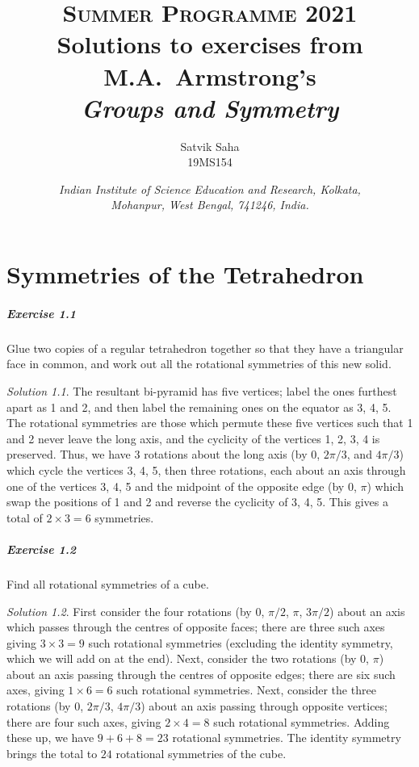 \documentclass[11pt]{report}
\title{
    \Large\textsc{Summer Programme 2021} \\
    \vspace{10pt}
    \huge Solutions to exercises from M.A.~Armstrong's \\
    \textit{Groups and Symmetry} 
}
\author{
    \large Satvik Saha%
    \\\textsc{\small 19MS154}
}
\date{\normalsize
    \textit{Indian Institute of Science Education and Research, Kolkata, \\
    Mohanpur, West Bengal, 741246, India.} \\
}
\theoremstyle{remark}
\newtheorem*{solution}{Solution}
\begin{document}
    \maketitle
    \tableofcontents


    \chapter{Symmetries of the Tetrahedron}

    \paragraph{Exercise 1.1} Glue two copies of a regular tetrahedron together so
    that they have a triangular face in common, and work out all the rotational
    symmetries of this new solid.
    \begin{solution}
        The resultant bi-pyramid has five vertices; label the ones furthest apart as
        1 and 2, and then label the remaining ones on the equator as 3, 4, 5. The
        rotational symmetries are those which permute these five vertices such that
        1 and 2 never leave the long axis, and the cyclicity of the vertices 1, 2,
        3, 4 is preserved. Thus, we have 3 rotations about the long axis (by $0$,
        $2\pi / 3$, and $4\pi / 3$) which cycle the vertices 3, 4, 5, then three
        rotations, each about an axis through one of the vertices 3, 4, 5 and the
        midpoint of the opposite edge (by $0$, $\pi$) which swap the positions of 1
        and 2 and reverse the cyclicity of 3, 4, 5. This gives a total of $2\times 3
        = 6$ symmetries.
    \end{solution}

    \paragraph{Exercise 1.2} Find all rotational symmetries of a cube.
    \begin{solution}
        First consider the four rotations (by $0$, $\pi / 2$, $\pi$, $3\pi / 2$)
        about an axis which passes through the centres of opposite faces; there are
        three such axes giving $3\times 3 = 9$ such rotational symmetries (excluding
        the identity symmetry, which we will add on at the end).
        Next, consider the two rotations (by $0$, $\pi$) about an axis passing
        through the centres of opposite edges; there are six such axes, giving
        $1\times 6 = 6$ such rotational symmetries.
        Next, consider the three rotations (by $0$, $2\pi / 3$, $4\pi / 3$) about an
        axis passing through opposite vertices; there are four such axes, giving
        $2\times 4 = 8$ such rotational symmetries. Adding these up, we have $9 + 6
        + 8 = 23$ rotational symmetries. The identity symmetry brings the total to
        $24$ rotational symmetries of the cube.
    \end{solution}
\end{document}
